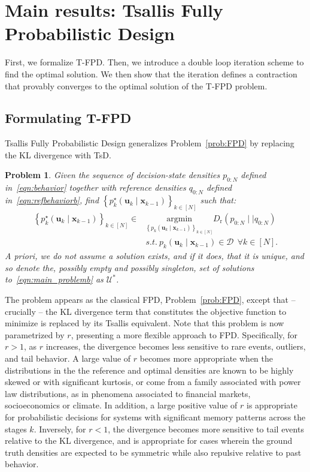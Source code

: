 \documentclass[a4paper,fleqn]{cas-sc}
\newtheorem{Problem}{Problem}
\newcommand{\bv}[1]{\mathbf{#1}}
\newcommand{\sD}{\mathcal{D}}
\newcommand{\sU}{\mathcal{U}}
\newcommand{\Dr}[2]{{D}_{\text{r}}\left(#1\mid \mid #2 \right)}
\newcommand{\policy}[2]{p_{{#1}}\left(\bv{u}_{{#1}}\mid \bv{x}_{{#2}} \right)}
\newcommand{\optimalpolicy}[2]{p^{\star}_{{#1}} \left(\bv{u}_{{#1}}\mid \bv{x}_{{#2}} \right)}
\newcommand{\TsD}{TsD}
\begin{document}
\section{Main results: Tsallis Fully Probabilistic Design}\label{sec:mainresults}

First, we formalize T-FPD. Then, we introduce a double loop iteration scheme to find the optimal solution. We then show that the iteration defines a contraction that provably converges to the optimal solution of the T-FPD problem. 

\subsection{Formulating T-FPD}

Tsallis Fully Probabilistic Design generalizes Problem~\ref{prob:FPD} by replacing the KL divergence with \TsD.

\begin{Problem}\label{prob:mainb}
Given the sequence of decision-state densities $p_{0:N}$ defined in~\eqref{eqn:behavior} together with reference densities  $q_{0:N}$ defined in~\eqref{eqn:refbehaviorb}, find $\left\{\optimalpolicy{k}{k-1}\right\}_{k\in[N]}$ such that: 
\begin{equation}\label{eqn:main_problemb}
    \begin{aligned}
{\left\{\optimalpolicy{k}{k-1}\right\}_{k\in[N]}}\in & \underset{\left\{ \policy{k}{k-1}\right\}_{k\in[N]}}{\mathrm{argmin}}
    \Dr{p_{0:N}}{q_{0:N}} \\
   &  s.t.  \  \policy{k}{k-1}\in\sD \ \ \forall k\in [N].
    \end{aligned}
\end{equation}
A priori, we do not assume a solution exists, and if it does, that it is unique, and so denote the, possibly empty and possibly singleton, set of solutions to~\eqref{eqn:main_problemb} as $\sU^*$.
\end{Problem}

The problem appears as the classical FPD, Problem~\ref{prob:FPD}, except that -- crucially -- the KL divergence term that constitutes the objective function to minimize is replaced by its Tsallis equivalent. Note that this problem is now parametrized by $r$, presenting a more flexible approach to FPD. Specifically, for $r>1$, as $r$ increases, the divergence becomes less sensitive to rare events, outliers, and tail behavior. A large value of $r$ becomes more appropriate when the distributions in the the reference and optimal densities are known to be highly skewed or with significant kurtosis, or come from a family associated with power law distributions, as in phenomena associated to financial markets, socioeconomics or climate. In addition, a large positive value of $r$ is appropriate for probabilistic decisions for systems with significant memory patterns across the stages $k$. Inversely, for $r<1$, the divergence becomes more sensitive to tail events relative to the KL divergence, and is appropriate for cases wherein the ground truth densities are expected to be symmetric while also repulsive relative to past behavior. 
\end{document}
